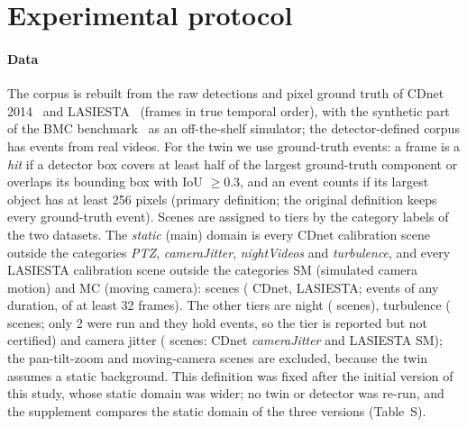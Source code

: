 \section{Experimental protocol}\label{sec:protocol}

\paragraph{Data} The corpus is rebuilt from the raw detections and pixel ground truth of CDnet 2014~\cite{cdnet2014} and
LASIESTA~\cite{lasiesta2016} (frames in true temporal order), with the synthetic part of the BMC benchmark~\cite{bmc2012} as an
off-the-shelf simulator; the detector-defined corpus has \nCorpusT{} events from \nCorpusTvideos{} real videos. For the
twin we use ground-truth events: a frame is a \emph{hit} if a detector box covers at least half of the largest
ground-truth component or overlaps its bounding box with IoU $\ge0.3$, and an event counts if its largest object has at
least 256 pixels (primary definition; the original definition keeps every ground-truth event). Scenes are assigned
to tiers by the category labels of the two datasets. The \emph{static} (main) domain is every CDnet calibration scene
outside the categories \emph{PTZ}, \emph{cameraJitter}, \emph{nightVideos} and \emph{turbulence}, and every LASIESTA
calibration scene outside the categories SM (simulated camera motion) and MC (moving camera): \nMainScenes{} scenes
(\nMainCDnet{} CDnet, \nMainLASIESTA{} LASIESTA; \nDefAllA{} events of any duration, \nMainN{} of at least 32 frames).
The other tiers are night (\nNightScenes{} scenes), turbulence (\nTurbScenes{} scenes; only 2 were run and they hold
\nTurbN{} events, so the tier is reported but not certified) and camera jitter (\nJitterScenes{} scenes: CDnet
\emph{cameraJitter} and LASIESTA SM); the \nPTZScenes{} pan-tilt-zoom and \nMCScenes{} moving-camera scenes are
excluded, because the twin assumes a static background. This definition was fixed after the initial version of this
study, whose static domain was wider; no twin or detector was re-run, and the supplement compares the static domain
of the three versions (Table~S\SuppTabVersions).

